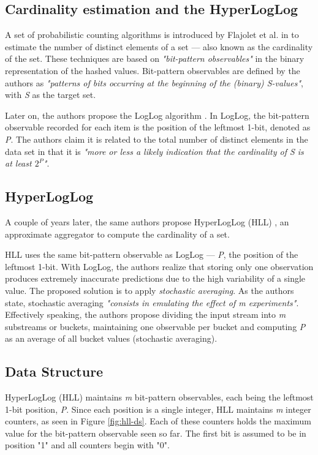 \subsection{Cardinality estimation and the HyperLogLog} \label{sec:hyper-log-log}

A set of probabilistic counting algorithms is introduced by Flajolet et al. in \cite{Flajolet-PCA} to estimate the number of distinct elements of a set --- also known as the cardinality of the set. These techniques are based on \textit{"bit-pattern observables"} in the binary representation of the hashed values. Bit-pattern observables are defined by the authors as \textit{"patterns of bits occurring at the beginning of the (binary) S-values"}, with \textit{S} as the target set.

Later on, the authors propose the LogLog algorithm \cite{Flajolet-LogLog}. In LogLog, the bit-pattern observable recorded for each item is the position of the leftmost 1-bit, denoted as \textit{P}. The authors claim it is related to the total number of distinct elements in the data set in that it is \textit{"more or less a likely indication that the cardinality of S is at least $2^P$"}.


\subsection*{HyperLogLog}
A couple of years later, the same authors propose HyperLogLog (HLL) \cite{Flajolet-HLL}, an approximate aggregator to compute the cardinality of a set. 

HLL uses the same bit-pattern observable as LogLog --- \textit{P}, the position of the leftmost 1-bit. With LogLog, the authors realize that storing only one observation produces extremely inaccurate predictions due to the high variability of a single value. The proposed solution is to apply \textit{stochastic averaging}. As the authors state, stochastic averaging \textit{"consists in emulating the effect of m experiments"}. Effectively speaking, the authors propose dividing the input stream into \textit{m} substreams or buckets, maintaining one observable per bucket and computing \textit{P} as an average of all bucket values (stochastic averaging).

\subsection*{Data Structure}
HyperLogLog (HLL) maintains \textit{m} bit-pattern observables, each being the leftmost 1-bit position, \textit{P}. Since each position is a single integer, HLL maintains \textit{m} integer counters, as seen in Figure \ref{fig:hll-ds}. Each of these counters holds the maximum value for the bit-pattern observable seen so far. The first bit is assumed to be in position "1" and all counters begin with "0".

